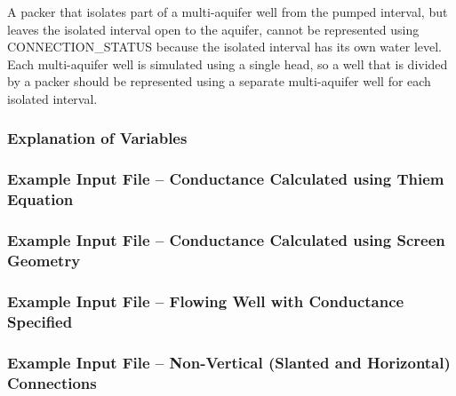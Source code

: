 A packer that isolates part of a multi-aquifer well from the pumped interval, but leaves the isolated interval open to the aquifer, cannot be represented using CONNECTION\_STATUS because the isolated interval has its own water level. Each multi-aquifer well is simulated using a single head, so a well that is divided by a packer should be represented using a separate multi-aquifer well for each isolated interval.

\vspace{5mm}
\subsubsection{Explanation of Variables}
\begin{description}

\end{description}

\vspace{5mm}
\subsubsection{Example Input File -- Conductance Calculated using Thiem Equation}

\subsubsection{Example Input File -- Conductance Calculated using Screen Geometry}

\subsubsection{Example Input File -- Flowing Well with Conductance Specified}

\subsubsection{Example Input File -- Non-Vertical (Slanted and Horizontal) Connections}


\vspace{5mm}
